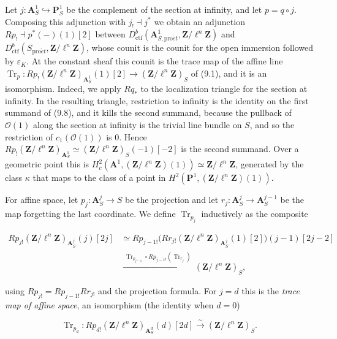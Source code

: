 \documentclass[11pt]{article}
\begin{document}
Let \(j:\mathbf A^1_S\hookrightarrow\mathbf P^1_S\) be the complement of the section at infinity, and let \(p=q\circ j\). Composing this adjunction with \(j_!\dashv j^*\) we obtain an adjunction \(Rp_!\dashv p^*(-)(1)[2]\) between \(D^b_{\mathrm{ctf}}(\mathbf A^1_{S,\mathrm{pro}\acute{e}t},\mathbf Z/\ell^n\mathbf Z)\) and \(D^b_{\mathrm{ctf}}(S_{\mathrm{pro}\acute{e}t},\mathbf Z/\ell^n\mathbf Z)\), whose counit is the counit for the open immersion followed by \(\varepsilon_K\). At the constant sheaf this counit is the trace map of the affine line \(\operatorname{Tr}_p:Rp_!(\mathbf Z/\ell^n\mathbf Z)_{\mathbf A^1_S}(1)[2]
\to(\mathbf Z/\ell^n\mathbf Z)_S\) of (9.1), and it is an isomorphism. Indeed, we apply \(Rq_*\) to the localization triangle for the section at infinity. In the resulting triangle, restriction to infinity is the identity on the first summand of (9.8), and it kills the second summand, because the pullback of \(\mathcal O(1)\) along the section at infinity is the trivial line bundle on \(S\), and so the restriction of \(c_1(\mathcal O(1))\) is \(0\). Hence \(Rp_!(\mathbf Z/\ell^n\mathbf Z)_{\mathbf A^1_S}\simeq
(\mathbf Z/\ell^n\mathbf Z)_S(-1)[-2]\) is the second summand. Over a geometric point this is \(H^2_c(\mathbf A^1,(\mathbf Z/\ell^n\mathbf Z)(1))\simeq
\mathbf Z/\ell^n\mathbf Z\), generated by the class \(\kappa\) that maps to the class of a point in \(H^2(\mathbf P^1,(\mathbf Z/\ell^n\mathbf Z)(1))\).

For affine space, let \(p_j:\mathbf A^j_S\to S\) be the projection and let \(r_j:\mathbf A^j_S\to\mathbf A^{j-1}_S\) be the map forgetting the last coordinate. We define \(\operatorname{Tr}_{p_j}\) inductively as the composite

\[
\begin{aligned}
Rp_{j!}(\mathbf Z/\ell^n\mathbf Z)_{\mathbf A^j_S}(j)[2j]
&\simeq Rp_{j-1!}\bigl(Rr_{j!}(\mathbf Z/\ell^n\mathbf Z)_{\mathbf A^j_S}(1)[2]\bigr)(j-1)[2j-2]\\
&\xrightarrow{\ \operatorname{Tr}_{p_{j-1}}\circ Rp_{j-1!}(\operatorname{Tr}_{r_j})\ }
(\mathbf Z/\ell^n\mathbf Z)_S,
\end{aligned}
\]

using \(Rp_{j!}=Rp_{j-1!}Rr_{j!}\) and the projection formula. For \(j=d\) this is the \emph{trace map of affine space}, an isomorphism (the identity when \(d=0\))

\[
\operatorname{Tr}_{p_d}:Rp_{d!}(\mathbf Z/\ell^n\mathbf Z)_{\mathbf A^d_S}(d)[2d]
\xrightarrow{\sim}(\mathbf Z/\ell^n\mathbf Z)_{S}.
\tag{9.11}
\]
\end{document}
